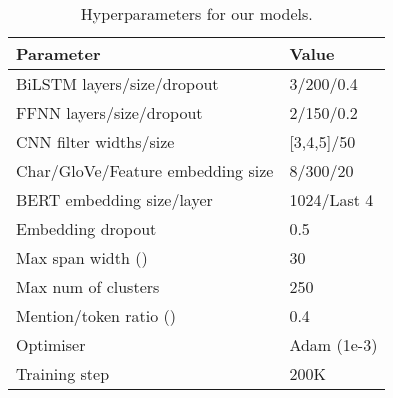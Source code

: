 \documentclass[10pt, a4paper]{article}
\begin{document}
\begin{table}[t]
    \centering
    \small
    \begin{tabular}{l l}
    \toprule
    \bf Parameter & \bf Value \\
    \midrule
    BiLSTM layers/size/dropout &3/200/0.4\\
FFNN layers/size/dropout & 2/150/0.2\\
CNN filter widths/size& [3,4,5]/50\\
Char/GloVe/Feature embedding size&8/300/20\\
BERT embedding size/layer&1024/Last 4\\
Embedding dropout & 0.5\\
    Max span width ()&30\\
    Max num of clusters&250\\
    Mention/token ratio () &0.4\\
    Optimiser & Adam (1e-3)\\
Training step & 200K\\
    \bottomrule
    \end{tabular}
    \caption{Hyperparameters for our models.}
    \label{table:config}
\end{table}
\end{document}
